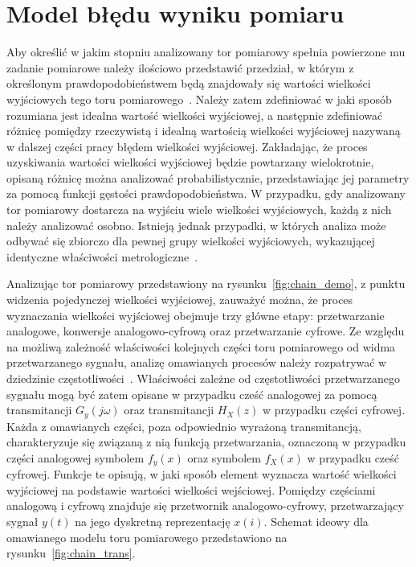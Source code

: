 \chapter{Model błędu wyniku pomiaru}

Aby określić w jakim stopniu analizowany tor pomiarowy spełnia powierzone mu zadanie pomiarowe należy ilościowo przedstawić przedział, w którym z określonym prawdopodobieństwem będą znajdowały się wartości wielkości wyjściowych tego toru pomiarowego~\cite{jcgm_guide}. Należy zatem zdefiniować w jaki sposób rozumiana jest idealna wartość wielkości wyjściowej, a następnie zdefiniować różnicę pomiędzy rzeczywistą i idealną wartością wielkości wyjściowej nazywaną w dalszej części pracy błędem wielkości wyjściowej. Zakładając, że proces uzyskiwania wartości wielkości wyjściowej będzie powtarzany wielokrotnie, opisaną różnicę można analizować probabilistycznie, przedstawiając jej parametry za pomocą funkcji gęstości prawdopodobieństwa. W przypadku, gdy analizowany tor pomiarowy dostarcza na wyjściu wiele wielkości wyjściowych, każdą z nich należy analizować osobno. Istnieją jednak przypadki, w których analiza może odbywać się zbiorczo dla pewnej grupy wielkości wyjściowych, wykazującej identyczne właściwości metrologiczne~\cite{auth_electronics}.

Analizując tor pomiarowy przedstawiony na rysunku~\ref{fig:chain_demo}, z punktu widzenia pojedynczej wielkości wyjściowej, zauważyć można, że proces wyznaczania wielkości wyjściowej obejmuje trzy główne etapy: przetwarzanie analogowe, konwersje analogowo-cyfrową oraz przetwarzanie cyfrowe. Ze względu na możliwą zależność właściwości kolejnych części toru pomiarowego od widma przetwarzanego sygnału, analizę omawianych procesów należy rozpatrywać w dziedzinie częstotliwości~\cite{jakubiec_system}. Właściwości zależne od częstotliwości przetwarzanego sygnału mogą być zatem opisane w przypadku cześć analogowej za pomocą transmitancji $G_{y}(j\omega)$ oraz transmitancji $H_{X}(z)$ w przypadku części cyfrowej. Każda z omawianych części, poza odpowiednio wyrażoną transmitancją, charakteryzuje się związaną z nią funkcją przetwarzania, oznaczoną w przypadku części analogowej symbolem $f_{y}(x)$ oraz symbolem $f_{X}(x)$ w przypadku cześć cyfrowej. Funkcje te opisują, w jaki sposób element wyznacza wartość wielkości wyjściowej na podstawie wartości wielkości wejściowej. Pomiędzy częściami analogową i cyfrową znajduje się przetwornik analogowo-cyfrowy, przetwarzający sygnał $y(t)$ na jego dyskretną reprezentację $x(i)$. Schemat ideowy dla omawianego modelu toru pomiarowego przedstawiono na rysunku~\ref{fig:chain_trans}.

